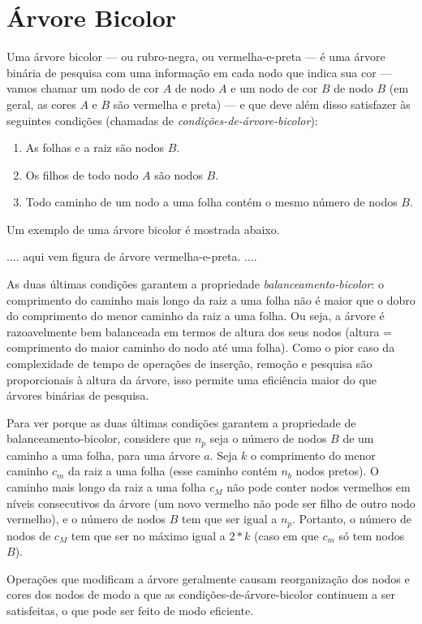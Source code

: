 \section{Árvore Bicolor}
\label{sec:arvore-bicolor}

Uma árvore bicolor --- ou rubro-negra, ou vermelha-e-preta --- é uma
árvore binária de pesquisa com uma informação em cada nodo que indica
sua cor --- vamos chamar um nodo de cor $A$ de nodo $A$ e um nodo de
cor $B$ de nodo $B$ (em geral, as cores $A$ e $B$ são vermelha e
preta) --- e que deve além disso satisfazer às seguintes condições
(chamadas de {\em condições-de-árvore-bicolor\/}):

\begin{enumerate}

\item As folhas e a raiz são nodos $B$.

\item Os filhos de todo nodo $A$ são nodos $B$.

\item Todo caminho de um nodo a uma folha contém o mesmo número de
  nodos $B$.

\end{enumerate}

Um exemplo de uma árvore bicolor é mostrada abaixo.

.... aqui vem figura de árvore vermelha-e-preta. ....

As duas últimas condições garantem a propriedade {\em
  balanceamento-bicolor\/}: o comprimento do caminho mais longo da
raiz a uma folha não é maior que o dobro do comprimento do menor
caminho da raiz a uma folha. Ou seja, a árvore é razoavelmente bem
balanceada em termos de altura dos seus nodos (altura = comprimento do
maior caminho do nodo até uma folha). Como o pior caso da complexidade
de tempo de operações de inserção, remoção e pesquisa são
proporcionais à altura da árvore, isso permite uma eficiência maior do
que árvores binárias de pesquisa.

Para ver porque as duas últimas condições garantem a propriedade de
balanceamento-bicolor, considere que $n_p$ seja o número de nodos $B$
de um caminho a uma folha, para uma árvore $a$.  Seja $k$ o
comprimento do menor caminho $c_m$ da raiz a uma folha (esse caminho
contém $n_b$ nodos pretos). O caminho mais longo da raiz a uma folha
$c_M$ não pode conter nodos vermelhos em níveis consecutivos da árvore
(um novo vermelho não pode ser filho de outro nodo vermelho), e o
número de nodos $B$ tem que ser igual a $n_p$. Portanto, o número de
nodos de $c_M$ tem que ser no máximo igual a $2*k$ (caso em que $c_m$
só tem nodos $B$).

Operações que modificam a árvore geralmente causam reorganização dos
nodos e cores dos nodos de modo a que as condições-de-árvore-bicolor
continuem a ser satisfeitas, o que pode ser feito de modo eficiente.

